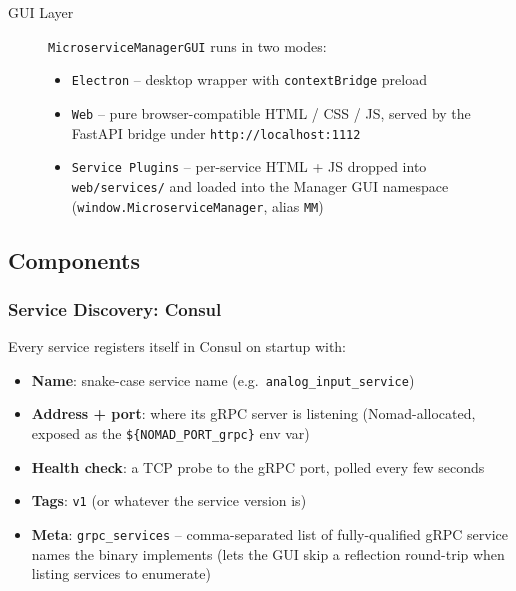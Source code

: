 \begin{description}
   \item[GUI Layer] \texttt{MicroserviceManagerGUI} runs in two modes:
        \begin{itemize}
           \item \texttt{Electron} -- desktop wrapper with \texttt{contextBridge} preload
           \item \texttt{Web} -- pure browser-compatible HTML / CSS / JS, served by the
                 FastAPI bridge under \texttt{http://localhost:1112}
           \item \texttt{Service Plugins} -- per-service HTML + JS dropped into
                 \texttt{web/services/} and loaded into the Manager GUI namespace
                 (\texttt{window.MicroserviceManager}, alias \texttt{MM})
        \end{itemize}
\end{description}

\subsection{Components}

\subsubsection{Service Discovery: Consul}

Every service registers itself in Consul on startup with:

\begin{itemize}
   \item \textbf{Name}: snake-case service name (e.g.\ \texttt{analog\_input\_service})
   \item \textbf{Address + port}: where its gRPC server is listening
        (Nomad-allocated, exposed as the \texttt{\$\{NOMAD\_PORT\_grpc\}} env var)
   \item \textbf{Health check}: a TCP probe to the gRPC port, polled every few seconds
   \item \textbf{Tags}: \texttt{v1} (or whatever the service version is)
   \item \textbf{Meta}: \texttt{grpc\_services} -- comma-separated list of fully-qualified
        gRPC service names the binary implements (lets the GUI skip a reflection
        round-trip when listing services to enumerate)
\end{itemize}

